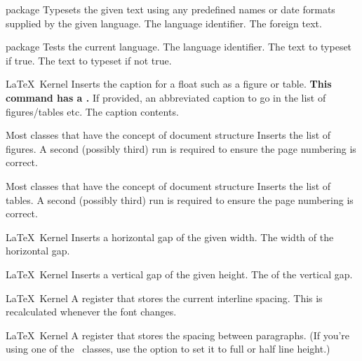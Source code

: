 %
 {}%
 { package}%
 {Typesets the given text using any predefined names or date formats supplied by the
  given language.
 }%
 {%
   \BeginArgList
     The language identifier.
     The foreign text.
   \EndArgList
 }

%
 {}%
 { package}%
 {Tests the current language.}%
 {%
   \BeginArgList
     The language identifier.
     The text to typeset if true.
     The text to typeset if not true.
   \EndArgList
 }

%
 {}%
 {\LaTeX\ Kernel}%
 {Inserts the caption for a float such as a figure or table. 
  \textbf{This command has a .}}%
 {%
   \BeginArgList
     If provided, an abbreviated caption
      to go in the list of figures\slash tables etc.
     The caption contents.
   \EndArgList
 }

%
 {}%
 {Most classes that have the concept of document structure}%
 {Inserts the list of figures. A second (possibly third) run
  is required to ensure the page numbering is correct.}%
 {}

%
 {}%
 {Most classes that have the concept of document structure}%
 {Inserts the list of tables. A second (possibly third) run
  is required to ensure the page numbering is correct.}%
 {}

%
 {}%
 {\LaTeX\ Kernel}%
 {Inserts a horizontal gap of the given width.}%
 {%
   \BeginArgList
     The width of the horizontal gap.
   \EndArgList
 }

%
 {}%
 {\LaTeX\ Kernel}%
 {Inserts a vertical gap of the given height.}%
 {%
   \BeginArgList
     The \protect{} of the vertical gap.
   \EndArgList
 }

%
 {}%
 {\LaTeX\ Kernel}%
 {A  register that stores the current interline spacing.
  This is recalculated whenever the font changes.}%
 {}

%
 {}%
 {\LaTeX\ Kernel}%
 {A  register that stores the spacing between paragraphs.
  (If you're using one of the \koma\ classes, use the  
   option to set it to full or half line height.)}%
 {}

